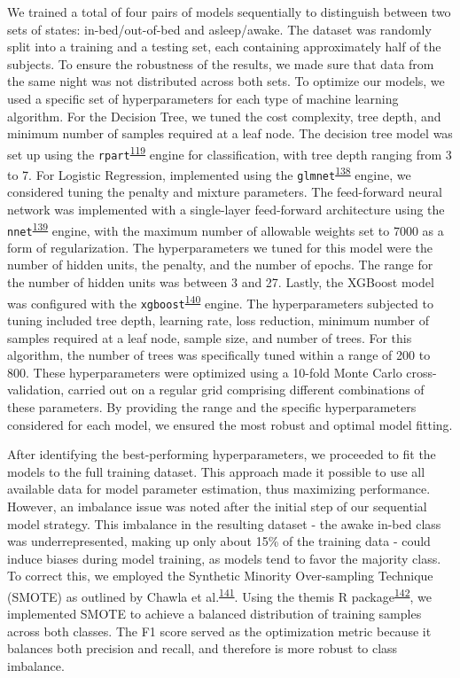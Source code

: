 \documentclass[
  9pt,
]{scrbook}
\begin{document}
We trained a total of four pairs of models sequentially to distinguish
between two sets of states: in-bed/out-of-bed and asleep/awake. The
dataset was randomly split into a training and a testing set, each
containing approximately half of the subjects. To ensure the robustness
of the results, we made sure that data from the same night was not
distributed across both sets. To optimize our models, we used a specific
set of hyperparameters for each type of machine learning algorithm. For
the Decision Tree, we tuned the cost complexity, tree depth, and minimum
number of samples required at a leaf node. The decision tree model was
set up using the
\texttt{rpart}\textsuperscript{\protect\hyperlink{ref-rpart}{119}}
engine for classification, with tree depth ranging from 3 to 7. For
Logistic Regression, implemented using the
\texttt{glmnet}\textsuperscript{\protect\hyperlink{ref-friedman_glmnet_2010}{138}}
engine, we considered tuning the penalty and mixture parameters. The
feed-forward neural network was implemented with a single-layer
feed-forward architecture using the
\texttt{nnet}\textsuperscript{\protect\hyperlink{ref-nnet}{139}} engine,
with the maximum number of allowable weights set to 7000 as a form of
regularization. The hyperparameters we tuned for this model were the
number of hidden units, the penalty, and the number of epochs. The range
for the number of hidden units was between 3 and 27. Lastly, the XGBoost
model was configured with the
\texttt{xgboost}\textsuperscript{\protect\hyperlink{ref-xgboost}{140}}
engine. The hyperparameters subjected to tuning included tree depth,
learning rate, loss reduction, minimum number of samples required at a
leaf node, sample size, and number of trees. For this algorithm, the
number of trees was specifically tuned within a range of 200 to 800.
These hyperparameters were optimized using a 10-fold Monte Carlo
cross-validation, carried out on a regular grid comprising different
combinations of these parameters. By providing the range and the
specific hyperparameters considered for each model, we ensured the most
robust and optimal model fitting.

After identifying the best-performing hyperparameters, we proceeded to
fit the models to the full training dataset. This approach made it
possible to use all available data for model parameter estimation, thus
maximizing performance. However, an imbalance issue was noted after the
initial step of our sequential model strategy. This imbalance in the
resulting dataset - the awake in-bed class was underrepresented, making
up only about 15\% of the training data - could induce biases during
model training, as models tend to favor the majority class. To correct
this, we employed the Synthetic Minority Over-sampling Technique (SMOTE)
as outlined by Chawla et
al.\textsuperscript{\protect\hyperlink{ref-chawla_smote_2002}{141}}.
Using the themis R
package\textsuperscript{\protect\hyperlink{ref-themis}{142}}, we
implemented SMOTE to achieve a balanced distribution of training samples
across both classes. The F1 score served as the optimization metric
because it balances both precision and recall, and therefore is more
robust to class imbalance.
\end{document}
